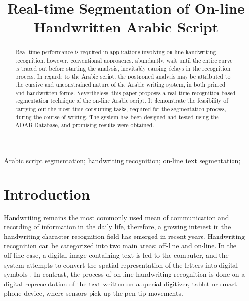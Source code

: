 \documentclass[10pt, conference, compsocconf]{IEEEtran}
\begin{document}
\title{Real-time Segmentation of On-line Handwritten Arabic Script}

\author{
\and
{}
}

\maketitle

\begin{abstract}
Real-time performance is required in applications involving on-line handwriting recognition, however, conventional approaches, abundantly, wait until the entire curve is traced out before starting the analysis, inevitably causing delays in the recognition process. 
In regards to the Arabic script, the postponed analysis may be attributed to the cursive and unconstrained nature of the Arabic writing system, in both printed and handwritten forms. 
Nevertheless, this paper proposes a real-time recognition-based segmentation technique of the on-line Arabic script.
It demonstrate the feasibility of carrying out the most time consuming tasks, required for the segmentation process, during the course of writing. 
The system has been designed and tested using the ADAB Database, and promising results were obtained.\\
\end{abstract}

\begin{IEEEkeywords}
Arabic script segmentation; handwriting recognition; on-line text segmentation; 
\end{IEEEkeywords}

\section{Introduction}
Handwriting remains the most commonly used mean of communication and recording of information in the daily life, therefore, a growing interest in the handwriting character recognition field has emerged in recent years. 
Handwriting recognition can be categorized into two main areas: off-line and on-line. 
In the off-line case, a digital image containing text is fed to the computer, and the system attempts to convert the spatial representation of the letters into digital symbols \cite{al2011online}. 
In contrast, the process of on-line handwriting recognition is done on a digital representation of the text written on a special digitizer, tablet or smart-phone device, where sensors pick up the pen-tip movements.
 
\end{document}
